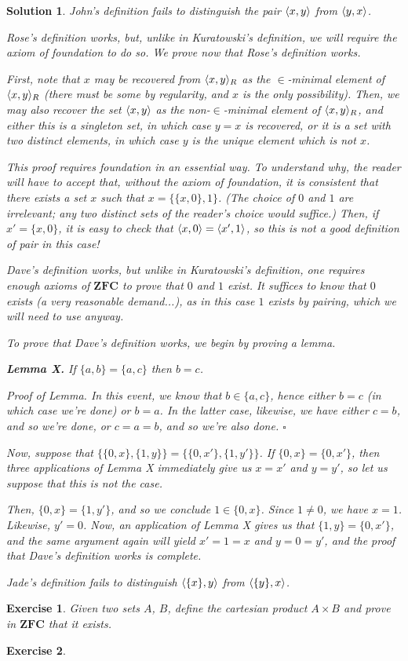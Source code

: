 \documentclass{article}
\newtheorem{ex}{Exercise}
\theoremstyle{nonumberplain}
\newtheorem{sol}{Solution}
\DeclarePairedDelimiter{\braket}{\langle}{\rangle}
\newcommand{\ZFC}{\mathbf{ZFC}}
\begin{document}
\begin{sol}
John's definition fails to distinguish the pair $\braket{x,y}$ from $\braket{y,x}$.

\smallskip

Rose's definition works, but, unlike in Kuratowski's definition, we will require the axiom of foundation to do so. We prove now that Rose's definition works.

First, note that $x$ may be recovered from $\braket{x,y}_R$ as the $\in$-minimal element of $\braket{x,y}_R$ (there must be some by regularity, and $x$ is the only possibility). Then, we may also recover the set $\braket{x,y}$ as the non-$\in$-minimal element of $\braket{x,y}_R$, and either this is a singleton set, in which case $y = x$ is recovered, or it is a set with two distinct elements, in which case $y$ is the unique element which is not $x$.

This proof requires foundation in an essential way. To understand why, the reader will have to accept that, without the axiom of foundation, it is consistent that there exists a set $x$ such that $x = \{\{x,0\}, 1\}$. (The choice of $0$ and $1$ are irrelevant; any two distinct sets of the reader's choice would suffice.) Then, if $x' = \{x,0\}$, it is easy to check that $\braket{x, 0} = \braket{x', 1}$, so this is not a good definition of pair in this case!

\smallskip

Dave's definition works, but unlike in Kuratowski's definition, one requires enough axioms of $\ZFC$ to prove that $0$ and $1$ exist. It suffices to know that $0$ exists (a very reasonable demand...), as in this case $1$ exists by pairing, which we will need to use anyway.

To prove that Dave's definition works, we begin by proving a lemma.

\textbf{Lemma X.} If $\{a,b\} = \{a,c\}$ then $b=c$.

\textit{Proof of Lemma.} In this event, we know that $b \in \{a,c\}$, hence either $b=c$ (in which case we're done) or $b = a$. In the latter case, likewise, we have either $c=b$, and so we're done, or $c = a = b$, and so we're also done. \hfill $\square$

Now, suppose that $\{\{0,x\},\{1,y\}\} = \{\{0,x'\},\{1,y'\}\}$. If $\{0,x\} = \{0,x'\}$, then three applications of Lemma X immediately give us $x = x'$ and $y = y'$, so let us suppose that this is not the case.

Then, $\{0,x\} = \{1,y'\}$, and so we conclude $1 \in \{0,x\}$. Since $1 \neq 0$, we have $x = 1$. Likewise, $y' = 0$. Now, an application of Lemma X gives us that $\{1,y\} = \{0,x'\}$, and the same argument again will yield $x' = 1 = x$ and $y = 0 = y'$, and the proof that Dave's definition works is complete.

\smallskip

Jade's definition fails to distinguish $\braket{\{x\}, y}$ from $\braket{\{y\}, x}$.
\end{sol}

\begin{ex}
Given two sets $A$, $B$, define the cartesian product $A \times B$ and prove in $\ZFC$ that it exists.
\end{ex}

\begin{ex}

\end{ex}
\end{document}
